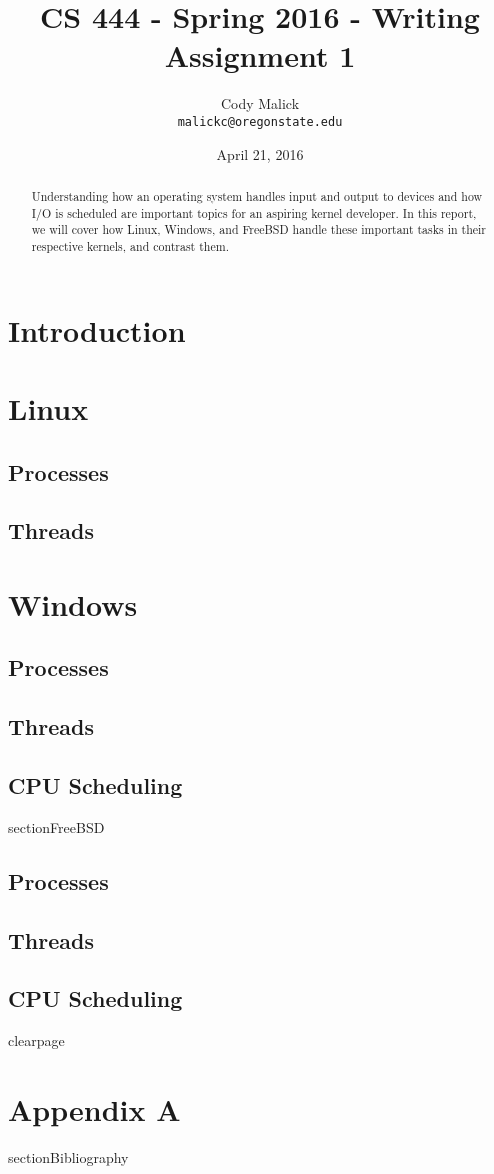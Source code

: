 \documentclass[10pt,letterpaper,onecolumn,draftclsnofoot]{IEEEtran}
\begin{document}
\begin{titlepage}
  \title{CS 444 - Spring 2016 - Writing Assignment 1}
  \author{Cody Malick\\
  \texttt{malickc@oregonstate.edu}}
  \date{April 21, 2016}
  \maketitle
  \vspace*{4cm}
  \begin{abstract}
      \noindent Understanding how an operating system handles input and output
      to devices and how I/O is scheduled are important topics for an aspiring
      kernel developer. In this report, we will cover how Linux, Windows, and
      FreeBSD handle these important tasks in their respective kernels, 
      and contrast them.
  \end{abstract}
\end{titlepage}

\tableofcontents
\clearpage
\section{Introduction}

\section{Linux}
  \subsection{Processes}
  \subsection{Threads}
\section{Windows}
 \subsection{Processes}
 \subsection{Threads}
 \subsection{CPU Scheduling}
section{FreeBSD}
 \subsection{Processes}
 \subsection{Threads}
 \subsection{CPU Scheduling}
clearpage
\section{Appendix A}
section{Bibliography}



\end{document}
